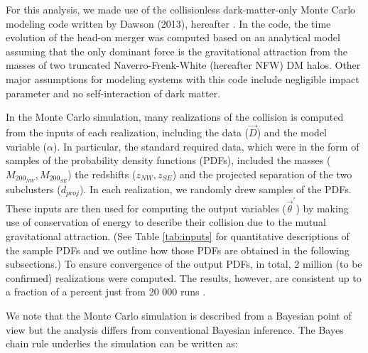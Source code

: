 For this analysis, we made use of the collisionless 
dark-matter-only Monte Carlo modeling code written by Dawson (2013),
hereafter .  
In the code, the time evolution of the head-on merger was computed
based on an analytical model assuming that the only dominant force is the gravitational attraction from
the masses of two truncated Naverro-Frenk-White (hereafter NFW) DM halos.
Other major assumptions for modeling systems with this code include
negligible impact parameter and no self-interaction of dark matter.\par

In the Monte Carlo simulation, many realizations of the collision is
computed from the inputs of each realization, including
the data ($\vec{D}$) and the model variable ($\alpha$). In particular,
the standard required data, which were in the form of samples of the probability density
functions (PDFs), included the masses ($M_{200_{NW}},M_{200_{SE}}$) the
redshifts ($z_{NW}, z_{SE}$) and the projected separation of the two
subclusters ($d_{proj}$).  
In each realization, we randomly drew samples of the PDFs.
%
These inputs are then used for computing the output variables
($\vec{\theta}^\prime$) by making use of conservation of energy to describe
their collision due to the mutual gravitational attraction.
(See Table \ref{tab:inputs}
for quantitative descriptions of the sample PDFs and we outline how those
PDFs are obtained in the following subsections.) 
To ensure convergence of the output PDFs, in total, 2 million (to be
confirmed) realizations were computed. The results, however, are
consistent up to a fraction of a percent just from 20 000 runs
.\par    
We note that the Monte Carlo simulation is described from a Bayesian
point of view but the analysis differs from conventional Bayesian inference. The Bayes
chain rule underlies the simulation can be written as:
